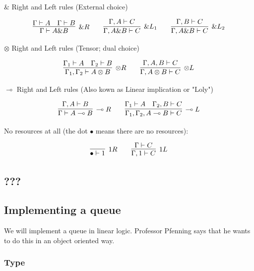 \documentclass{article}
\begin{document}
	$\&$ Right and Left rules (External choice)

	\[
	\infer[\&\scriptsize{R}]
	{\Gamma \vdash A \& B}{\Gamma \vdash A \hspace{1em} \Gamma \vdash B}
	\qquad
	\infer[\&\scriptsize{L_1}]
	{\Gamma, A \& B \vdash C}{\Gamma, A \vdash C}
	\qquad
	\infer[\&\scriptsize{L_2}]
	{\Gamma, A \& B \vdash C}{\Gamma, B \vdash C}
	\]


	$\otimes$ Right and Left rules (Tensor; dual choice)

	\[
	\infer[\otimes\scriptsize{R}]
	{\Gamma_{1}, \Gamma_{2} \vdash A \otimes B}{\Gamma_{1} \vdash A \hspace{1em} \Gamma_{2} \vdash B}
	\qquad
	\infer[\otimes\scriptsize{L}]
	{\Gamma , A \otimes B \vdash C}{\Gamma, A, B \vdash C}
	\]

	$\multimap$ Right and Left rules (Also kown as Linear implication or "Loly")

	\[
	\infer[\multimap\scriptsize{R}]
	{\Gamma \vdash A \multimap B}{\Gamma, A \vdash B}
	\qquad
	\infer[\multimap\scriptsize{L}]
	{\Gamma_{1}, \Gamma_{2}, A \multimap B \vdash C}{\Gamma_{1} \vdash A \hspace{1em} \Gamma_{2}, B \vdash C}
	\]

	No resources at all (the dot $ \bullet $ means there are no resources):

	\[
	\infer[\scriptsize{1R}]
	{\bullet \vdash 1}{}
	\qquad
	\infer[\scriptsize{1L}]
	{\Gamma, 1 \vdash C}{\Gamma \vdash C}
	\]


	\subsection{???}
	\subsection{Implementing a queue}
	We will implement a queue in linear logic. Professor Pfenning says that he wants to do this in an object oriented way. 
	
	\subsubsection{Type}
	
\end{document}
